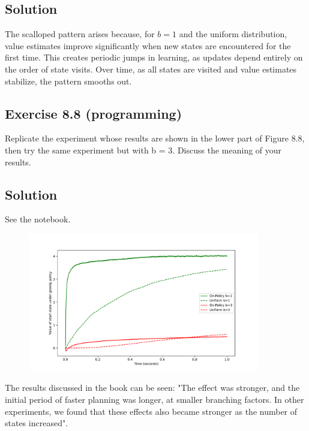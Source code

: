 \subsection*{Solution}

The scalloped pattern arises because, for $b=1$ and the uniform distribution, value estimates improve significantly when new states are encountered for the first time. This creates periodic jumps in learning, as updates depend entirely on the order of state visits. Over time, as all states are visited and value estimates stabilize, the pattern smooths out.

\subsection*{Exercise 8.8 (programming)}
Replicate the experiment whose results are shown in the
lower part of Figure 8.8, then try the same experiment but with b = 3. Discuss the
meaning of your results.

\subsection*{Solution}
See the notebook.

\begin{figure}[H]
    \centering
    \includegraphics[width=0.9\textwidth]{chapters_latex/figures/ex_08_08.pdf}
    \captionsetup{labelformat=empty}
\end{figure}

The results discussed in the book can be seen: "The effect was stronger, and the initial period of faster planning was longer, at smaller branching factors. In other experiments, we found that these effects also became stronger as the number of states increased".